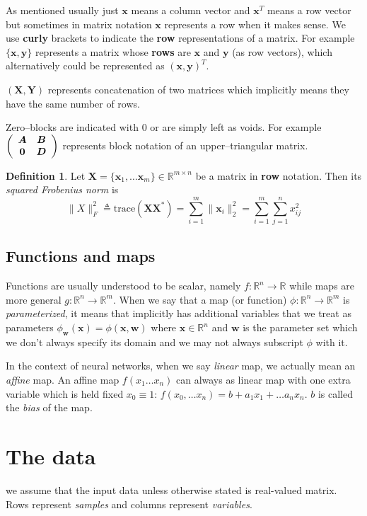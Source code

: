 \documentclass[11pt, a4paper]{report}
\theoremstyle{plain}
\theoremstyle{definition}
\newtheorem{mydef}{Definition}[chapter]
\theoremstyle{remark}
\newcommand{\R}{\mathbb{R}}
\newcommand{\X}{\mathbf{X}}
\newcommand{\x}{\mathbf{x}}
\newcommand{\Y}{\mathbf{Y}}
\newcommand{\y}{\mathbf{y}}
\newcommand{\w}{\mathbf{w}}
\newcommand{\bv}[1]{\boldsymbol{#1}}
\begin{document}
As mentioned usually just $\x$ means a column vector and $\x^T$ means a row
vector but sometimes in matrix notation $\x$ represents a row when it makes
sense.
We use \textbf{curly} brackets to indicate the \textbf{row} representations of a matrix.
For example $\{\x, \y\}$ represents a matrix whose \textbf{rows} are $\x$ and $\y$
(as row vectors), which alternatively could be represented as
$(\x, \y)^T$.

$(\X,\Y)$ represents
concatenation of two matrices which implicitly means they have the same number
of rows.

Zero--blocks are indicated with $0$ or are simply left as voids. For
example $ \left( \begin{array}{c c} \bv{A} & \bv{B} \\ \bv{0} & \bv{D}
\end{array} \right) $ represents block notation of an upper--triangular matrix.

\begin{mydef}
Let $\X = \{\x_1, \dots \x_m\} \in \R^{m \times n}$
be a matrix in \textbf{row} notation. Then its \emph{squared Frobenius norm} is
\begin{equation}
\label{def:frobnorm}
\|X\|_F^2 \triangleq \text{trace}(\X \X^*) 
= \sum_{i=1}^{m} \|\x_i\|^2_2 = \sum_{i=1}^m \sum_{j=1}^n x_{ij}^2
\end{equation}
\end{mydef}


\subsection{Functions and maps}
Functions are usually understood to be scalar, namely $f:\R^n \to \R$ while maps
are more general $g:\R^n \to \R^m$. When we say that a map (or function) $\phi
:\R^n \to \R^m$ is \emph{parameterized}, it means that implicitly has additional 
variables that we treat as parameters $\phi_{\w}(\x) = \phi(\x, \w)$ where $\x \in \R^n$
and $\w$ is the parameter set which we don't always specify its domain and we may not
always subscript $\phi$ with it.

In the context of neural networks, when we say \emph{linear} map, we actually mean an
\emph{affine} map.
An affine map $f(x_1 \dots x_n)$ can always as linear map with one extra variable 
which is held fixed $x_0 \equiv 1$: $f(x_0, \dots x_n) = b + a_1 x_1 + \dots a_n
x_n$. $b$ is called the \emph{bias} of the map.
\label{affinelinear}

\section{The data}
we assume that the input data unless otherwise stated is real-valued matrix.
Rows represent \emph{samples} 
and columns represent \emph{variables}.
\end{document}

